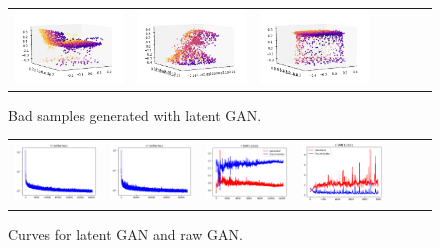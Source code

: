\documentclass[12pt]{article}
\begin{document}
    \begin{figure}
        \centering
        \begin{tabular}{lllllll}
            \includegraphics[width = 30mm]{chair_latent_gen_3_bad} &
            \includegraphics[width = 30mm]{lamp_latent_gen_3_bad} &
            \includegraphics[width = 30mm]{table_latent_gen_3_bad} \\
        \end{tabular}
        \caption{Bad samples generated with latent GAN.}
        \label{figure:bad_samples_generated_with_latent_gan}
    \end{figure}


    \begin{figure}
        \centering
        \begin{tabular}{lllllll}
            \includegraphics[width = 30mm]{chair_l_gan_curves} &
            \includegraphics[width = 30mm]{table_l_gan_curves} &
            \includegraphics[width = 30mm]{chair_raw_gan_curves} &
            \includegraphics[width = 30mm]{lamp_raw_gan_curves} \\
        \end{tabular}
        \caption{Curves for latent GAN and raw GAN.}
        \label{figure:curves_for_latent_gan_and_raw_gan}
    \end{figure}
\end{document}
